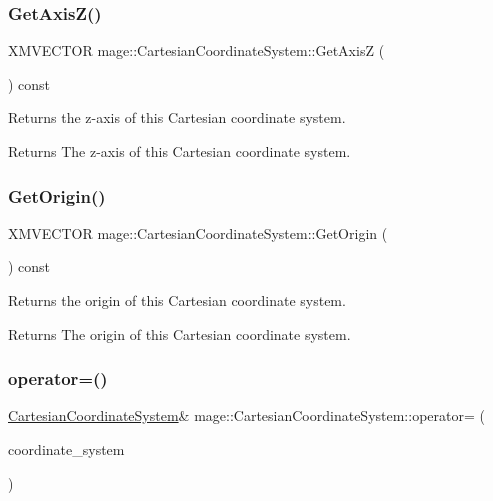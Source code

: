 \subsubsection{\texorpdfstring{Get\+Axis\+Z()}{GetAxisZ()}}
{\footnotesize\ttfamily X\+M\+V\+E\+C\+T\+OR mage\+::\+Cartesian\+Coordinate\+System\+::\+Get\+AxisZ (\begin{DoxyParamCaption}{ }\end{DoxyParamCaption}) const}

Returns the z-\/axis of this Cartesian coordinate system.

\begin{DoxyReturn}{Returns}
The z-\/axis of this Cartesian coordinate system. 
\end{DoxyReturn}
\hypertarget{structmage_1_1_cartesian_coordinate_system_ac413d8f94f94102faa47d7c5cf8813b9}{}\label{structmage_1_1_cartesian_coordinate_system_ac413d8f94f94102faa47d7c5cf8813b9} 
\subsubsection{\texorpdfstring{Get\+Origin()}{GetOrigin()}}
{\footnotesize\ttfamily X\+M\+V\+E\+C\+T\+OR mage\+::\+Cartesian\+Coordinate\+System\+::\+Get\+Origin (\begin{DoxyParamCaption}{ }\end{DoxyParamCaption}) const}

Returns the origin of this Cartesian coordinate system.

\begin{DoxyReturn}{Returns}
The origin of this Cartesian coordinate system. 
\end{DoxyReturn}
\hypertarget{structmage_1_1_cartesian_coordinate_system_acf9dab4edc5c07b5bbf6bee0bdfe317c}{}\label{structmage_1_1_cartesian_coordinate_system_acf9dab4edc5c07b5bbf6bee0bdfe317c} 
\subsubsection{\texorpdfstring{operator=()}{operator=()}}
{\footnotesize\ttfamily \hyperlink{structmage_1_1_cartesian_coordinate_system}{Cartesian\+Coordinate\+System}\& mage\+::\+Cartesian\+Coordinate\+System\+::operator= (\begin{DoxyParamCaption}\item[{const \hyperlink{structmage_1_1_cartesian_coordinate_system}{Cartesian\+Coordinate\+System} \&}]{coordinate\+\_\+system }\end{DoxyParamCaption})\hspace{0.3cm}{\ttfamily [default]}}

